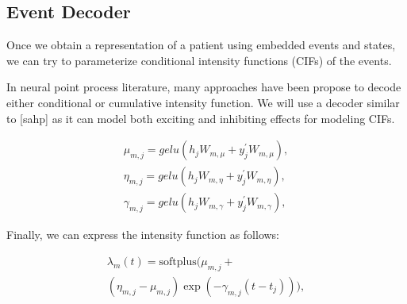 \documentclass[journal,twoside,web]{ieeecolor}
\begin{document}









\subsection{Event Decoder}
Once we obtain a representation of a patient using embedded events and states, we can try to parameterize conditional intensity functions (CIFs) of the events.

In neural point process literature, many approaches have been propose to decode either conditional or cumulative intensity function. We will use a decoder similar to [sahp] as it can model both exciting and inhibiting effects for modeling CIFs.


\begin{gather} 
    \mu_{m,j}=gelu(h_{j}W_{m,\mu}  +  y^{\prime}_{j}W_{m,\mu}), \\ 
    \eta_{m,j}=gelu(h_{j}W_{m,\eta}  +  y^{\prime}_{j}W_{m,\eta}), \\
    \gamma_{m,j}=gelu(h_{j}W_{m,\gamma}  +  y^{\prime}_{j}W_{m,\gamma}),
    \end{gather}

Finally, we can express the intensity function as follows:

\begin{multline}
    \lambda_m(t)=\text{softplus}(\mu_{m,j}+\\
    (\eta_{m,j}- \mu_{m,j}) \exp(-\gamma_{m,j}(t-t_j))    ),
\end{multline}
\end{document}
